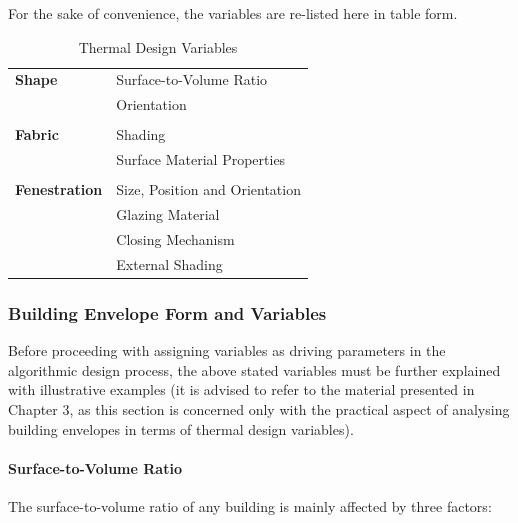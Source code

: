 For the sake of convenience, the variables are re-listed here in table form.

\begin{table}[H]
	\centering
	\begin{tabular}{l|l}
		\textbf{Shape}		&Surface-to-Volume Ratio\\
					&Orientation\\
					&\\
		\textbf{Fabric} 	&Shading\\
					&Surface Material Properties\\
					&\\
		\textbf{Fenestration}	&Size, Position and Orientation\\
					&Glazing Material\\
					&Closing Mechanism\\
					&External Shading\\
	\end{tabular}
	\caption{Thermal Design Variables}
	\label{tab:ThermalDesignVariables}
\end{table}

\subsubsection{Building Envelope Form and Variables}

Before proceeding with assigning variables as driving parameters in the algorithmic design process, the above stated variables must be further explained with illustrative examples (it is advised to refer to the material presented in Chapter 3, as this section is concerned only with the practical aspect of analysing building envelopes in terms of thermal design variables).

\paragraph{Surface-to-Volume Ratio}\mbox{}

The surface-to-volume ratio of any building is mainly affected by three factors:

